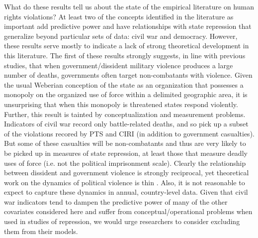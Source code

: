 \documentclass[12pt]{article}
\begin{document}
What do these results tell us about the state of the empirical literature on human rights violations? At least two of the concepts identified in the literature as important add predictive power and have relationships with state repression that generalize beyond particular sets of data: civil war and democracy. However, these results serve mostly to indicate a lack of strong theoretical development in this literature. The first of these results strongly suggests, in line with previous studies, that when government/dissident military violence produces a large number of deaths, governments often target non-combatants with violence. Given the usual Weberian conception of the state as an organization that possesses a monopoly on the organized use of force within a delimited geographic area, it is unsurprising that when this monopoly is threatened states respond violently. Further, this result is tainted by conceptualization and measurement problems. Indicators of civil war record only battle-related deaths, and so pick up a subset of the violations recored by PTS and CIRI (in addition to government casualties). But some of these casualties will be non-combatants and thus are very likely to be picked up in measures of state repression, at least those that measure deadly uses of force (i.e. not the political imprisonment scale). Clearly the relationship between dissident and government violence is strongly reciprocal, yet theoretical work on the dynamics of political violence is thin \citep[But see, e.g.][]{Moore2000,Pierskalla2010,RitterJCR}. Also, it is not reasonable to expect to capture these dynamics in annual, country-level data. Given that civil war indicators tend to dampen the predictive power of many of the other covariates considered here and suffer from conceptual/operational problems when used in studies of repression, we would urge researchers to consider excluding them from their models.  
\end{document}
